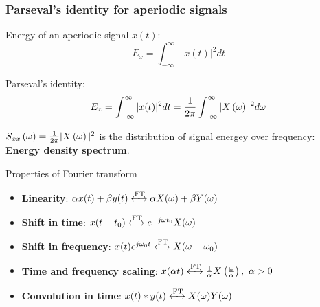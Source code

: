 \documentclass[aspectratio=169]{beamer}
\let\olditem\item
\renewcommand{\item}{\setlength{\itemsep}{\fill}\olditem}
\def\lp{\ensuremath\left(}
\def\rp{\ensuremath\right)}
\begin{document}
\begin{frame}[t]
  \frametitle{Parseval's identity for aperiodic signals}

  Energy of an aperiodic signal $x(t)$:
  \[ E_x = \int_{-\infty}^{\infty} \vert x(t) \vert^2 dt \]

  Parseval's identity:
  \[ E_x = \int_{-\infty}^{\infty} \vert x(t) \vert^2 dt = \frac{1}{2\pi}\int_{-\infty}^{\infty} \vert X\lp \omega \rp\vert^2 d\omega \]
  
  $S_{xx}\lp \omega \rp = \frac{1}{2\pi}\vert X\lp \omega \rp\vert^2$ is the distribution of signal energey over frequency: \textbf{Energy density spectrum}.

\end{frame}


\begin{frame}{Properties of Fourier transform}

\begin{itemize}
\item \textbf{Linearity}: $\alpha x(t) + \beta y(t) \xleftrightarrow{\text{FT}} \alpha X(\omega) + \beta Y(\omega)$
\item \textbf{Shift in time}: $ x(t-t_0) \xleftrightarrow{\text{FT}} e^{-j\omega t_0}X(\omega)$
\item \textbf{Shift in frequency}: $ x(t)e^{j\omega_0 t} \xleftrightarrow{\text{FT}} X(\omega - \omega_0) $
\item \textbf{Time and frequency scaling}: $ x(\alpha t) \xleftrightarrow{\text{FT}} \frac{1}{\alpha} X\left(\frac{\omega}{\alpha}\right), \,\, \alpha > 0 $
\item \textbf{Convolution in time}: $x(t) * y(t) \xleftrightarrow{\text{FT}} X(\omega)Y(\omega) $
\end{itemize}
\end{frame}
\end{document}
